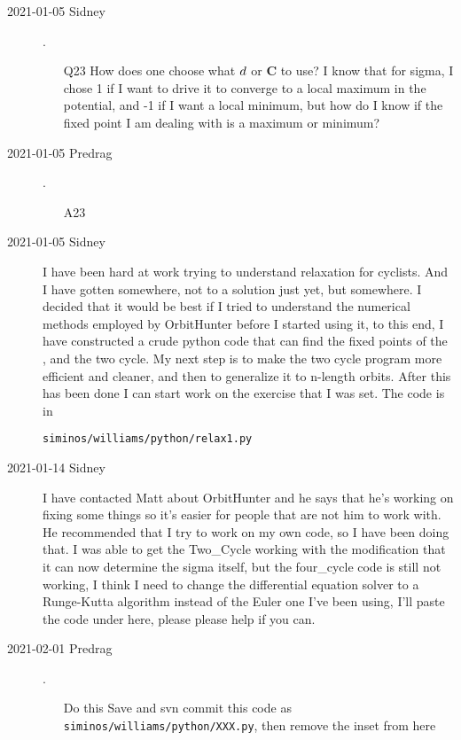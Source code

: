 \begin{description}
\item[2021-01-05 Sidney].
    \begin{itemize}
        \item[Q23]
How does one choose what $d$ or $\textbf{C}$ to use? I know that for
sigma, I chose 1 if I want to drive it to converge to a local maximum in
the potential, and -1 if I want a local minimum, but how do I know if the
fixed point I am dealing with is a maximum or minimum?
    \end{itemize}

\item[2021-01-05 Predrag].
    \begin{itemize}
        \item[A23]
    \end{itemize}

\item[2021-01-05 Sidney]
I have been hard at work trying to understand relaxation for cyclists.
And I have gotten somewhere, not to a solution just yet, but somewhere. I
decided that it would be best if I tried to understand the numerical
methods employed by OrbitHunter before I started using it, to this end, I
have constructed a crude python code that can find the fixed points of
the {\HenonMap}, and the two cycle. My next step is to make the two cycle
program more efficient and cleaner, and then to generalize it to n-length
orbits. After this has been done I can start work on the exercise that I
was set. The code is in

\texttt{siminos/williams/python/relax1.py}

\item[2021-01-14 Sidney]
I have contacted Matt about OrbitHunter and he says that he's working on
fixing some things so it's easier for people that are not him to work
with. He recommended that I try to work on my own code, so I have been
doing that. I was able to get the Two\_Cycle working with the
modification that it can now determine the sigma itself, but the
four\_cycle code is still not working, I think I need to change the
differential equation solver to a Runge-Kutta algorithm instead of the
Euler one I've been using, I'll paste the code under here, please please
help if you can.

\item[2021-02-01 Predrag].
    \begin{itemize}
        \item[Do this]
Save and svn commit this code as \texttt{siminos/williams/python/XXX.py},
then remove the inset from here
    \end{itemize}


\end{description}
